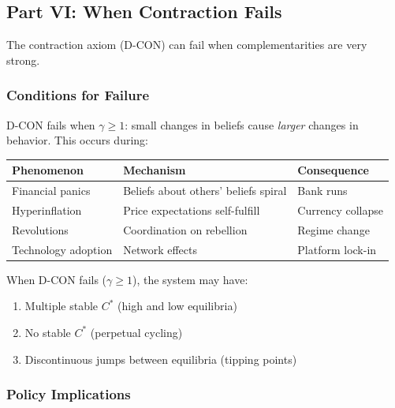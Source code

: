 
\subsection{Part VI: When Contraction Fails}
\label{sec:D-multiple}

The contraction axiom (D-CON) can fail when complementarities are very strong.

\subsubsection{Conditions for Failure}

D-CON fails when $\gamma \geq 1$: small changes in beliefs cause
\emph{larger} changes in behavior. This occurs during:

\begin{center}
\renewcommand{\arraystretch}{1.3}
\begin{tabular}{|l|l|l|}
\hline
\textbf{Phenomenon} & \textbf{Mechanism} & \textbf{Consequence} \\
\hline
Financial panics & Beliefs about others' beliefs spiral & Bank runs \\
Hyperinflation & Price expectations self-fulfill & Currency collapse \\
Revolutions & Coordination on rebellion & Regime change \\
Technology adoption & Network effects & Platform lock-in \\
\hline
\end{tabular}
\end{center}

\begin{theorem}
\label{thm:D-multiple}
When D-CON fails ($\gamma \geq 1$), the system may have:
\begin{enumerate}
    \item Multiple stable $C^*$ (high and low equilibria)
    \item No stable $C^*$ (perpetual cycling)
    \item Discontinuous jumps between equilibria (tipping points)
\end{enumerate}
\end{theorem}

\subsubsection{Policy Implications}

